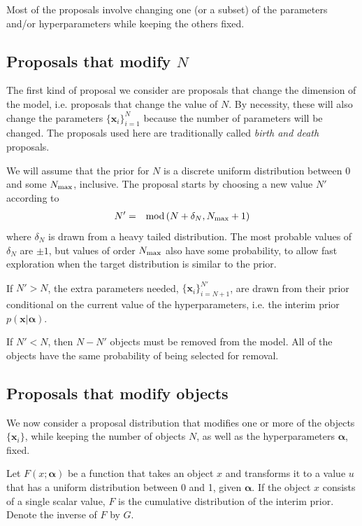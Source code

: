 \documentclass[letterpaper, 11pt]{article}
\newcommand{\hyperparams}{\boldsymbol{\alpha}}
\newcommand{\xx}{\mathbf{x}}
\begin{document}
Most of the proposals involve changing one (or a subset) of the parameters
and/or hyperparameters while keeping the others fixed.

\subsection{Proposals that modify $N$}\label{sec:proposal1}
The first kind of proposal we consider are proposals that change the
dimension of the model, i.e. proposals that change the value of $N$. By
necessity, these will also change the parameters $\{\xx_i\}_{i=1}^N$ because
the number of parameters will be changed. The proposals used here are
traditionally called {\it birth and death} proposals.

We will assume that the prior for $N$ is a discrete uniform distribution
between 0 and some $N_{\rm max}$, inclusive. The proposal starts by choosing
a new value $N'$ according to
\begin{eqnarray}
N' &=& \textnormal{mod}\left(N + \delta_N, N_{\rm max} + 1\right)
\end{eqnarray}
where $\delta_N$ is drawn from a heavy tailed
distribution. The most probable values of $\delta_N$ are $\pm 1$, but values
of order $N_{\rm max}$ also have some probability, to allow fast exploration
when the target distribution is similar to the prior.

If $N' > N$, the extra parameters needed, $\{\xx_i\}_{i=N+1}^{N'}$,
are drawn from their prior conditional on the current value of the
hyperparameters, i.e. the interim prior $p(\xx | \hyperparams)$.

If $N' < N$, then $N - N'$ objects must be removed from the model. All
of the objects have the same probability of being selected for removal.

\subsection{Proposals that modify objects}\label{sec:proposal2}
We now consider a proposal distribution that modifies one or more of the
objects $\{\xx_i\}$, while keeping the number of objects $N$, as well as the
hyperparameters $\hyperparams$, fixed.

Let $F(x; \hyperparams)$ be a function that takes an object $x$ and transforms it
to a value $u$ that has a uniform distribution between 0 and 1, given $\hyperparams$.
If the object $x$ consists of a single scalar value, $F$ is the cumulative
distribution of the interim prior. Denote the inverse of $F$ by $G$.
\end{document}

